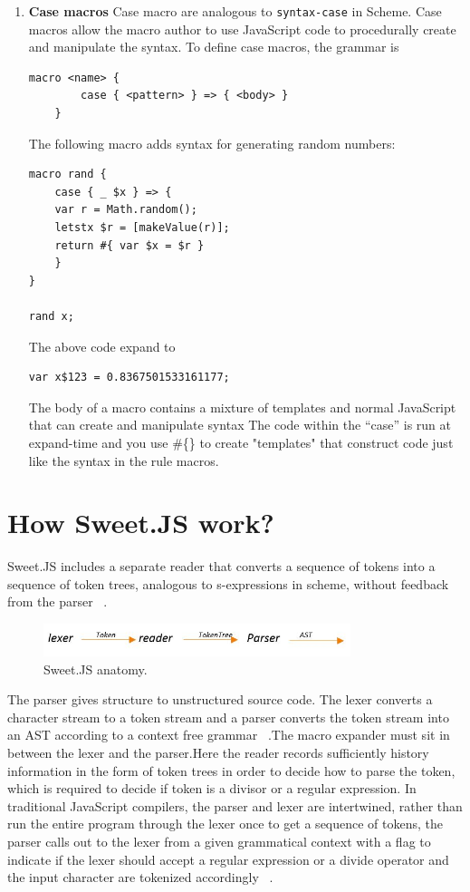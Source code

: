 \begin{enumerate}
\item {\bf Case macros }
Case macro are analogous to \texttt{syntax-case} in Scheme. Case macros allow the macro author to use JavaScript code to procedurally create and manipulate the syntax.
To define case macros, the grammar is
\begin{lstlisting}[frame=single]
	macro <name> {
  		case { <pattern> } => { <body> }
	}
\end{lstlisting}
The following macro adds syntax for generating random numbers:
\begin{lstlisting}[frame=single]
macro rand {
	case { _ $x } => {
	var r = Math.random();
	letstx $r = [makeValue(r)];
	return #{ var $x = $r }
	}
}

rand x;
\end{lstlisting}

The above code expand to

\begin{lstlisting}[frame=single]
	var x$123 = 0.8367501533161177;
\end{lstlisting}

The body of a macro contains a mixture of templates and normal JavaScript that can create and manipulate syntax
The code within the ``case'' is run at expand-time and you use \#\{\} to create "templates" that construct code just like the syntax in the rule macros.

\end{enumerate}

\section{How Sweet.JS work?}

Sweet.JS includes a separate reader that converts a sequence of tokens into a sequence of token trees, analogous to s-expressions in scheme, without feedback from the parser ~\cite{bib2}.

\begin{figure}[htb]
\centering
\includegraphics[width=0.8\textwidth]{images/Tokenizer.jpg}
\caption{Sweet.JS anatomy.} 
\label{fig:Tokenizer}
\end{figure}

The parser gives structure to unstructured source code. The lexer converts a character stream to a token stream and a parser converts the token stream into an AST according to a context free grammar ~\cite{bib2}.The macro expander  must sit in between the lexer and the parser.Here the reader records sufficiently history information in the form of token trees in order to decide how to parse the token, which is required to decide if token is a divisor or a regular expression.
In traditional JavaScript compilers, the parser and lexer are intertwined, rather than run the entire program through the lexer once to get a sequence of tokens, the parser calls out to the lexer from a given grammatical context with a flag to indicate if the lexer should accept a regular expression or a divide operator and the input character are tokenized accordingly ~\cite{bib2}.


